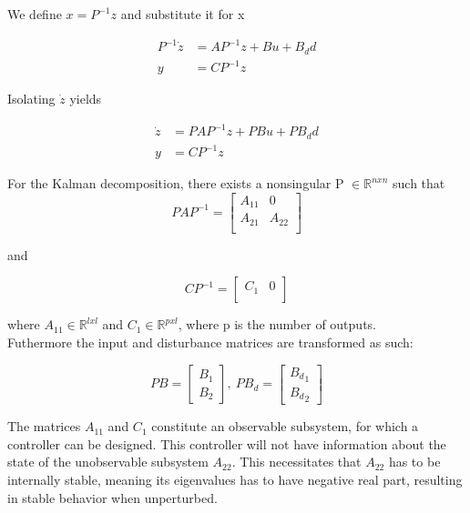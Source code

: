 We define $x = P^{-1}z$ and substitute it for x

\begin{equation} 
	\begin{split}
		P^{-1}\dot{z} & = AP^{-1}z + Bu + B_dd \\
		y & = CP^{-1}z
	\end{split}
\end{equation}

Isolating $\dot{z}$ yields

\begin{equation} 
	\begin{split}
		\dot{z} & = PAP^{-1}z + PBu + PB_dd \\
		y & = CP^{-1}z
	\end{split}
\end{equation}

For the Kalman decomposition, there exists a nonsingular P  $\in \mathbb{R} ^{n x n}$ such that 
\begin{equation} 
	PAP^{-1} = \begin{bmatrix}
		A_{11}       & 0 \\
		A_{21}       & A_{22} \\
	\end{bmatrix}
\end{equation}

and 

\begin{equation} 
	CP^{-1} = \begin{bmatrix}
		C_{1}       & 0 \\
	\end{bmatrix}
\end{equation}

where $A_{11} \in \mathbb{R} ^{l x l}$ and $C_{1} \in \mathbb{R} ^{p x l}$, where p is the number of outputs.\\Futhermore the input and disturbance matrices are transformed as such:

\begin{equation} 
	PB = \begin{bmatrix}
		B_1 \\
		B_2
	\end{bmatrix}, \
	PB_d = \begin{bmatrix}
		{B_d}_1 \\
		{B_d}_2
	\end{bmatrix}
\end{equation}


The matrices $A_{11}$ and $C_{1}$ constitute an observable subsystem, for which a controller can be designed. This controller will not have information about the state of the unobservable subsystem $A_{22}$. This necessitates that $A_{22}$ has to be internally stable, meaning its eigenvalues has to have negative real part, resulting in stable behavior when unperturbed.
